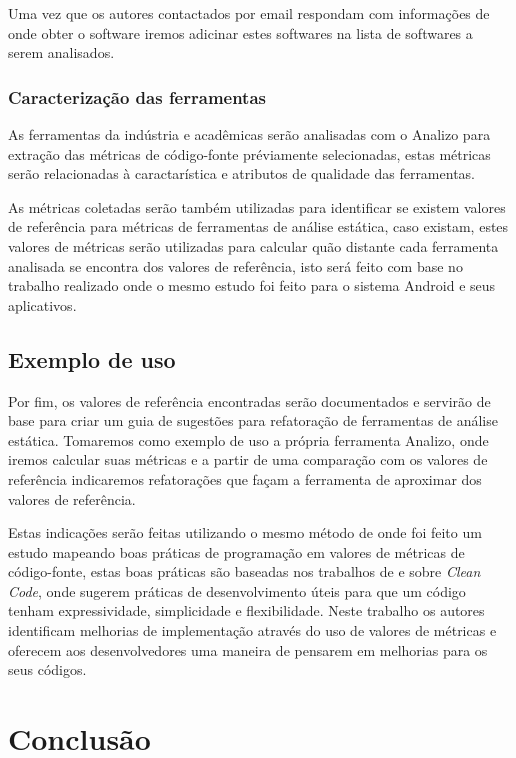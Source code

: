 \documentclass[qual, classic, a4paper]{ufbathesis}
\begin{document}
Uma vez que os autores contactados por email respondam com informações de onde
obter o software iremos adicinar estes softwares na lista de softwares a serem
analisados.

\subsection{Caracterização das ferramentas}

As ferramentas da indústria e acadêmicas serão analisadas com o Analizo para
extração das métricas de código-fonte préviamente
selecionadas, estas métricas serão relacionadas à caractarística e atributos
de qualidade das ferramentas.

As métricas coletadas serão também utilizadas para identificar se existem
valores de referência para métricas de ferramentas de análise estática, caso
existam, estes valores de métricas serão utilizadas para calcular quão
distante cada ferramenta analisada se encontra dos valores de referência, isto
será feito com base no trabalho realizado  onde o
mesmo estudo foi feito para o sistema Android e seus aplicativos.

\section{Exemplo de uso}

Por fim, os valores de referência encontradas serão documentados e servirão de
base para criar um guia de sugestões para refatoração de ferramentas de
análise estática. Tomaremos como exemplo de uso a própria ferramenta Analizo,
onde iremos calcular suas métricas e a partir de uma comparação com os
valores de referência indicaremos refatorações que façam a ferramenta de
aproximar dos valores de referência.

Estas indicações serão feitas utilizando o mesmo método de
 onde foi feito um estudo mapeando boas práticas de
programação em valores de métricas de código-fonte, estas boas práticas são
baseadas nos trabalhos de \cite{Martin2012} e \cite{Beck2007} sobre {\it Clean
Code}, onde sugerem práticas de desenvolvimento úteis para que um código
tenham expressividade, simplicidade e flexibilidade. Neste trabalho os autores
identificam melhorias de implementação através do uso de valores de métricas e
oferecem aos desenvolvedores uma maneira de pensarem em melhorias para os seus
códigos.

\chapter{Conclusão}
\end{document}
